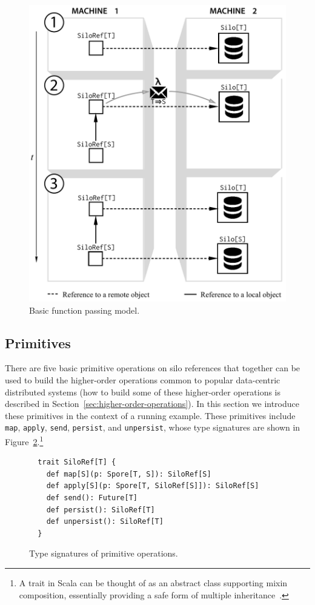 \documentclass{jfp1}
\begin{document}

\begin{figure}[ht!]
\centering\includegraphics[width=0.8\columnwidth]{pic/basic-diagram.pdf}
\caption{Basic function passing model.}\label{fig:basic-diagram}
\end{figure}


\subsection{Primitives}
\label{sec:primitives}

There are five basic primitive operations on silo references that
together can be used to build the higher-order operations common to
popular data-centric distributed systems (how to build some of these
higher-order operations is described in
Section~\ref{sec:higher-order-operations}). In this section we
introduce these primitives in the context of a running example. These
primitives include \verb|map|, \verb|apply|, \verb|send|, \verb|persist|,
and \verb|unpersist|, whose type signatures are shown in
Figure~\ref{fig:signatures}.\footnote{A trait in Scala can be thought
  of as an abstract class supporting mixin composition, essentially
  providing a safe form of multiple inheritance~\cite{OderskyZ05}.}

\begin{figure}
\centering
\begin{lstlisting}
  trait SiloRef[T] {
    def map[S](p: Spore[T, S]): SiloRef[S]
    def apply[S](p: Spore[T, SiloRef[S]]): SiloRef[S]
    def send(): Future[T]
    def persist(): SiloRef[T]
    def unpersist(): SiloRef[T]
  }
\end{lstlisting}
\caption{Type signatures of primitive operations.}\label{fig:signatures}
\end{figure}
\end{document}

